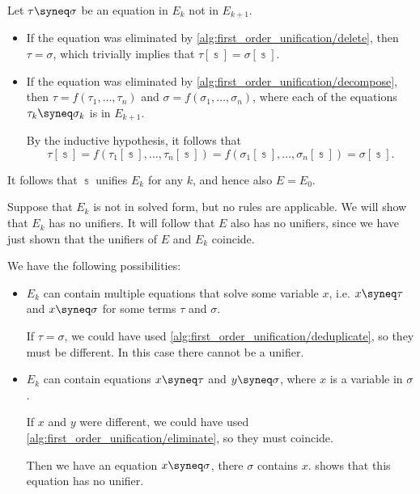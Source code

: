 \begin{defproof}
  Let \( \tau \syneq \sigma \) be an equation in \( E_k \) not in \( E_{k+1} \).
  \begin{itemize}
    \item If the equation was eliminated by \cref{alg:first_order_unification/delete}, then \( \tau = \sigma \), which trivially implies that \( \tau[\Bbbs] = \sigma[\Bbbs] \).
    \item If the equation was eliminated by \cref{alg:first_order_unification/decompose}, then \( \tau = f(\tau_1, \ldots, \tau_n) \) and \( \sigma = f(\sigma_1, \ldots, \sigma_n) \), where each of the equations \( \tau_k \syneq \sigma_k \) is in \( E_{k+1} \).

    By the inductive hypothesis, it follows that
    \begin{equation*}
      \tau[\Bbbs]
      =
      f(\tau_1[\Bbbs], \ldots, \tau_n[\Bbbs])
      =
      f(\sigma_1[\Bbbs], \ldots, \sigma_n[\Bbbs])
      =
      \sigma[\Bbbs].
    \end{equation*}
  \end{itemize}

  It follows that \( \Bbbs \) unifies \( E_k \) for any \( k \), and hence also \( E = E_0 \).

   Suppose that \( E_k \) is not in solved form, but no rules are applicable. We will show that \( E_k \) has no unifiers. It will follow that \( E \) also has no unifiers, since we have just shown that the unifiers of \( E \) and \( E_k \) coincide.

  We have the following possibilities:
  \begin{itemize}
    \item \( E_k \) can contain multiple equations that solve some variable \( x \), i.e. \( x \syneq \tau \) and \( x \syneq \sigma \) for some terms \( \tau \) and \( \sigma \).

    If \( \tau = \sigma \), we could have used \cref{alg:first_order_unification/deduplicate}, so they must be different. In this case there cannot be a unifier.

    \item \( E_k \) can contain equations \( x \syneq \tau \) and \( y \syneq \sigma \), where \( x \) is a variable in \( \sigma \).

    If \( x \) and \( y \) were different, we could have used \cref{alg:first_order_unification/eliminate}, so they must coincide.

    Then we have an equation \( x \syneq \sigma \), there \( \sigma \) contains \( x \).  shows that this equation has no unifier.


\end{itemize}
\end{defproof}
